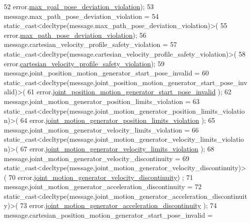 \begin{DoxyCode}
52           error.\hyperlink{structfranka_1_1Errors_ac55d3624087e606cb4ffab121869d580}{max\_goal\_pose\_deviation\_violation});
53   message.max\_path\_pose\_deviation\_violation =
54       \textcolor{keyword}{static\_cast<}decltype(message.max\_path\_pose\_deviation\_violation)\textcolor{keyword}{>}(
55           error.\hyperlink{structfranka_1_1Errors_ad90cffe703ca1b782007f3ba49da587c}{max\_path\_pose\_deviation\_violation});
56   message.cartesian\_velocity\_profile\_safety\_violation =
57       \textcolor{keyword}{static\_cast<}decltype(message.cartesian\_velocity\_profile\_safety\_violation)\textcolor{keyword}{>}(
58           error.\hyperlink{structfranka_1_1Errors_afc093fc5f99e1f6cab6de4fa9bc32692}{cartesian\_velocity\_profile\_safety\_violation});
59   message.joint\_position\_motion\_generator\_start\_pose\_invalid =
60       \textcolor{keyword}{static\_cast<}decltype(message.joint\_position\_motion\_generator\_start\_pose\_invalid)\textcolor{keyword}{>}(
61           error.\hyperlink{structfranka_1_1Errors_a7af91cbf61dc79304bff3ffadc51ea86}{joint\_position\_motion\_generator\_start\_pose\_invalid}
      );
62   message.joint\_motion\_generator\_position\_limits\_violation =
63       \textcolor{keyword}{static\_cast<}decltype(message.joint\_motion\_generator\_position\_limits\_violation)\textcolor{keyword}{>}(
64           error.\hyperlink{structfranka_1_1Errors_a9536ad072868b90525c56143cbb956ef}{joint\_motion\_generator\_position\_limits\_violation}
      );
65   message.joint\_motion\_generator\_velocity\_limits\_violation =
66       \textcolor{keyword}{static\_cast<}decltype(message.joint\_motion\_generator\_velocity\_limits\_violation)\textcolor{keyword}{>}(
67           error.\hyperlink{structfranka_1_1Errors_ae211638df9b0e23905c8a9d36e249207}{joint\_motion\_generator\_velocity\_limits\_violation}
      );
68   message.joint\_motion\_generator\_velocity\_discontinuity =
69       \textcolor{keyword}{static\_cast<}decltype(message.joint\_motion\_generator\_velocity\_discontinuity)\textcolor{keyword}{>}(
70           error.\hyperlink{structfranka_1_1Errors_abd6da8e6a32d817a7b4848a24efd9379}{joint\_motion\_generator\_velocity\_discontinuity})
      ;
71   message.joint\_motion\_generator\_acceleration\_discontinuity =
72       \textcolor{keyword}{static\_cast<}decltype(message.joint\_motion\_generator\_acceleration\_discontinuity)\textcolor{keyword}{>}(
73           error.\hyperlink{structfranka_1_1Errors_a633195adca91f5ecaf1506da12f3311f}{joint\_motion\_generator\_acceleration\_discontinuity}
      );
74   message.cartesian\_position\_motion\_generator\_start\_pose\_invalid =

\end{DoxyCode}

